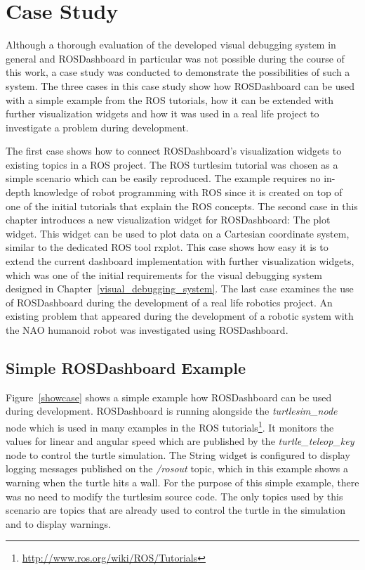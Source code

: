 \chapter{Case Study}
\label{case_study_chapter}
Although a thorough evaluation of the developed visual debugging system in general and ROSDashboard in particular was not possible during the course of this work, a case study was conducted to demonstrate the possibilities of such a system. The three cases in this case study show how ROSDashboard can be used with a simple example from the ROS tutorials, how it can be extended with further visualization widgets and how it was used in a real life project to investigate a problem during development.

The first case shows how to connect ROSDashboard's visualization widgets to existing topics in a ROS project. The ROS turtlesim tutorial was chosen as a simple scenario which can be easily reproduced. The example requires no in-depth knowledge of robot programming with ROS since it is created on top of one of the initial tutorials that explain the ROS concepts. The second case in this chapter introduces a new visualization widget for ROSDashboard: The plot widget. This widget can be used to plot data on a Cartesian coordinate system, similar to the dedicated ROS tool rxplot. This case shows how easy it is to extend the current dashboard implementation with further visualization widgets, which was one of the initial requirements for the visual debugging system designed in Chapter~\ref{visual_debugging_system}. The last case examines the use of ROSDashboard during the development of a real life robotics project. An existing problem that appeared during the development of a robotic system with the NAO humanoid robot was investigated using ROSDashboard.

\section{Simple ROSDashboard Example}
Figure~\ref{showcase} shows a simple example how ROSDashboard can be used during development. ROSDashboard is running alongside the \emph{turtlesim\_node} node which is used in many examples in the ROS tutorials\footnote{\url{http://www.ros.org/wiki/ROS/Tutorials}}. It monitors the values for linear and angular speed which are published by the \emph{turtle\_teleop\_key} node to control the turtle simulation. The String widget is configured to display logging messages published on the \emph{/rosout} topic, which in this example shows a warning when the turtle hits a wall. For the purpose of this simple example, there was no need to modify the turtlesim source code. The only topics used by this scenario are topics that are already used to control the turtle in the simulation and to display warnings.

